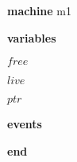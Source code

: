 \begin{block}
  \item   \textbf{machine} m1
  \item   \textbf{variables}
  \begin{block}
    \item   $free$
    \item   $live$
    \item   $ptr$
  \end{block}
  \item   
  \item   \textbf{events}
  \begin{block}
    \item   
    \item   
  \end{block}
  \item   \textbf{end} \\
\end{block}
